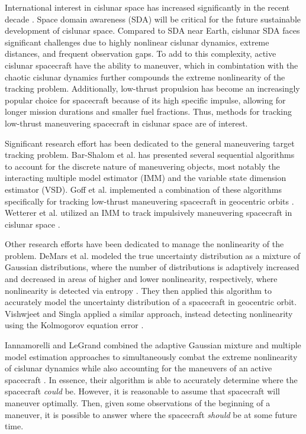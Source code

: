 \documentclass[letterpaper, preprint, paper,11pt]{AAS}	%
\begin{document}
International interest in cislunar space has increased significantly in the recent decade \cite{nelson2024moon}. Space domain awareness (SDA) will be critical for the future sustainable development of cislunar space. Compared to SDA near Earth, cislunar SDA faces significant challenges due to highly nonlinear cislunar dynamics, extreme distances, and frequent observation gaps. To add to this complexity, active cislunar spacecraft have the ability to maneuver, which in combintation with the chaotic cislunar dynamics further compounds the extreme nonlinearity of the tracking problem. Additionally, low-thrust propulsion has become an increasingly popular choice for spacecraft because of its high specific impulse, allowing for longer mission durations and smaller fuel fractions. Thus, methods for tracking low-thrust maneuvering spacecraft in cislunar space are of interest. 

Significant research effort has been dedicated to the general maneuvering target tracking problem. Bar-Shalom et al. has presented several sequential algorithms to account for the discrete nature of maneuvering objects, most notably the interacting multiple model estimator \cite{bar1989tracking} (IMM) and the variable state dimension estimator \cite{bar2007variable} (VSD). Goff et al. implemented a combination of these algorithms specifically for tracking low-thrust maneuvering spacecraft in geocentric orbits \cite{goff2015orbit}. Wetterer et al. utilized an IMM to track impulsively maneuvering spacecraft in cislunar space \cite{wetterer2022cislunar}.

Other research efforts have been dedicated to manage the nonlinearity of the problem. DeMars et al. modeled the true uncertainty distribution as a mixture of Gaussian distributions, where the number of distributions is adaptively increased and decreased in areas of higher and lower nonlinearity, respectively, where nonlinearity is detected via entropy \cite{demars2013entropy}. They then applied this algorithm to accurately model the uncertainty distribution of a spacecraft in geocentric orbit. Vishwjeet and Singla applied a similar approach, instead detecting nonlinearity using the Kolmogorov equation error \cite{vishwajet2018adaptive}. 

Iannamorelli and LeGrand combined the adaptive Gaussian mixture and multiple model estimation approaches to simultaneously combat the extreme nonlinearity of cislunar dynamics while also accounting for the maneuvers of an active spacecraft \cite{iannamorelli2025adaptive}. In essence, their algorithm is able to accurately determine where the spacecraft \textit{could} be. However, it is reasonable to assume that spacecraft will maneuver optimally. Then, given some observations of the beginning of a maneuver, it is possible to answer where the spacecraft \textit{should} be at some future time.
\end{document}
